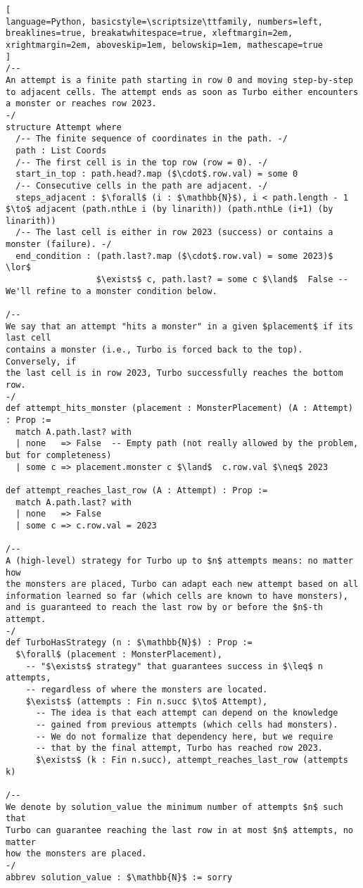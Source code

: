 \begin{tcolorbox}
\begin{lstlisting}[
language=Python, basicstyle=\scriptsize\ttfamily, numbers=left, breaklines=true, breakatwhitespace=true, xleftmargin=2em, xrightmargin=2em, aboveskip=1em, belowskip=1em, mathescape=true
]
/--
An attempt is a finite path starting in row 0 and moving step-by-step
to adjacent cells. The attempt ends as soon as Turbo either encounters
a monster or reaches row 2023.
-/
structure Attempt where
  /-- The finite sequence of coordinates in the path. -/
  path : List Coords
  /-- The first cell is in the top row (row = 0). -/
  start_in_top : path.head?.map ($\cdot$.row.val) = some 0
  /-- Consecutive cells in the path are adjacent. -/
  steps_adjacent : $\forall$ (i : $\mathbb{N}$), i < path.length - 1 $\to$ adjacent (path.nthLe i (by linarith)) (path.nthLe (i+1) (by linarith))
  /-- The last cell is either in row 2023 (success) or contains a monster (failure). -/
  end_condition : (path.last?.map ($\cdot$.row.val) = some 2023)$ \lor$
                  $\exists$ c, path.last? = some c $\land$  False -- We'll refine to a monster condition below.

/--
We say that an attempt "hits a monster" in a given $placement$ if its last cell
contains a monster (i.e., Turbo is forced back to the top). Conversely, if
the last cell is in row 2023, Turbo successfully reaches the bottom row.
-/
def attempt_hits_monster (placement : MonsterPlacement) (A : Attempt) : Prop :=
  match A.path.last? with
  | none   => False  -- Empty path (not really allowed by the problem, but for completeness)
  | some c => placement.monster c $\land$  c.row.val $\neq$ 2023

def attempt_reaches_last_row (A : Attempt) : Prop :=
  match A.path.last? with
  | none   => False
  | some c => c.row.val = 2023

/--
A (high-level) strategy for Turbo up to $n$ attempts means: no matter how
the monsters are placed, Turbo can adapt each new attempt based on all
information learned so far (which cells are known to have monsters),
and is guaranteed to reach the last row by or before the $n$-th attempt.
-/
def TurboHasStrategy (n : $\mathbb{N}$) : Prop :=
  $\forall$ (placement : MonsterPlacement),
    -- "$\exists$ strategy" that guarantees success in $\leq$ n attempts,
    -- regardless of where the monsters are located.
    $\exists$ (attempts : Fin n.succ $\to$ Attempt),
      -- The idea is that each attempt can depend on the knowledge
      -- gained from previous attempts (which cells had monsters).
      -- We do not formalize that dependency here, but we require
      -- that by the final attempt, Turbo has reached row 2023.
      $\exists$ (k : Fin n.succ), attempt_reaches_last_row (attempts k)

/--
We denote by solution_value the minimum number of attempts $n$ such that
Turbo can guarantee reaching the last row in at most $n$ attempts, no matter
how the monsters are placed.
-/
abbrev solution_value : $\mathbb{N}$ := sorry


\end{lstlisting}
\end{tcolorbox}
